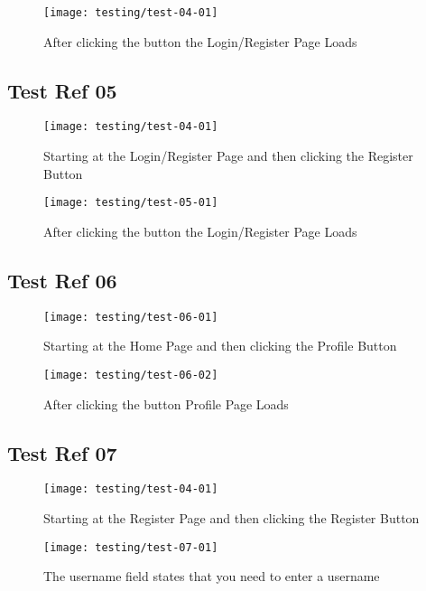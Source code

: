 \begin{figure}[H]
\centering
\texttt{[image: testing/test-04-01]}
\caption{After clicking the button the Login/Register Page Loads}
\label{test-04-02}
\end{figure}

\subsection{Test Ref 05}

\begin{figure}[H]
\centering
\texttt{[image: testing/test-04-01]}
\caption{Starting at the Login/Register Page and then clicking the Register Button}
\label{test-05-01}
\end{figure}

\begin{figure}[H]
\centering
\texttt{[image: testing/test-05-01]}
\caption{After clicking the button the Login/Register Page Loads}
\label{test-05-02}
\end{figure}

\subsection{Test Ref 06}

\begin{figure}[H]
\centering
\texttt{[image: testing/test-06-01]}
\caption{Starting at the Home Page and then clicking the Profile Button}
\label{test-06-01}
\end{figure}

\begin{figure}[H]
\centering
\texttt{[image: testing/test-06-02]}
\caption{After clicking the button Profile Page Loads}
\label{test-06-02}
\end{figure}

\subsection{Test Ref 07}

\begin{figure}[H]
\centering
\texttt{[image: testing/test-04-01]}
\caption{Starting at the Register Page and then clicking the Register Button}
\label{test-07-01}
\end{figure}

\begin{figure}[H]
\centering
\texttt{[image: testing/test-07-01]}
\caption{The username field states that you need to enter a username}
\label{test-07-02}
\end{figure}


